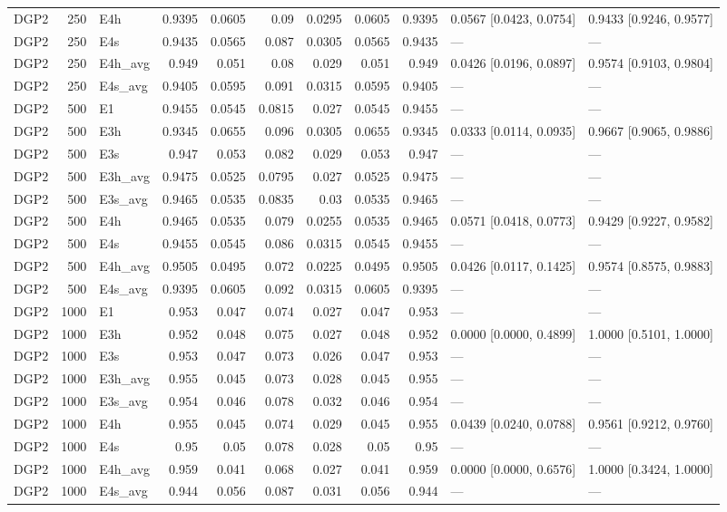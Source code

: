 \begin{scriptsize}
\begin{longtable}{lrlrrrrrrll}
DGP2 & 250 & E4h & 0.9395 & 0.0605 & 0.09 & 0.0295 & 0.0605 & 0.9395 & 0.0567 [0.0423, 0.0754] & 0.9433 [0.9246, 0.9577] \\
DGP2 & 250 & E4s & 0.9435 & 0.0565 & 0.087 & 0.0305 & 0.0565 & 0.9435 & --- & --- \\
DGP2 & 250 & E4h_avg & 0.949 & 0.051 & 0.08 & 0.029 & 0.051 & 0.949 & 0.0426 [0.0196, 0.0897] & 0.9574 [0.9103, 0.9804] \\
DGP2 & 250 & E4s_avg & 0.9405 & 0.0595 & 0.091 & 0.0315 & 0.0595 & 0.9405 & --- & --- \\
DGP2 & 500 & E1 & 0.9455 & 0.0545 & 0.0815 & 0.027 & 0.0545 & 0.9455 & --- & --- \\
DGP2 & 500 & E3h & 0.9345 & 0.0655 & 0.096 & 0.0305 & 0.0655 & 0.9345 & 0.0333 [0.0114, 0.0935] & 0.9667 [0.9065, 0.9886] \\
DGP2 & 500 & E3s & 0.947 & 0.053 & 0.082 & 0.029 & 0.053 & 0.947 & --- & --- \\
DGP2 & 500 & E3h_avg & 0.9475 & 0.0525 & 0.0795 & 0.027 & 0.0525 & 0.9475 & --- & --- \\
DGP2 & 500 & E3s_avg & 0.9465 & 0.0535 & 0.0835 & 0.03 & 0.0535 & 0.9465 & --- & --- \\
DGP2 & 500 & E4h & 0.9465 & 0.0535 & 0.079 & 0.0255 & 0.0535 & 0.9465 & 0.0571 [0.0418, 0.0773] & 0.9429 [0.9227, 0.9582] \\
DGP2 & 500 & E4s & 0.9455 & 0.0545 & 0.086 & 0.0315 & 0.0545 & 0.9455 & --- & --- \\
DGP2 & 500 & E4h_avg & 0.9505 & 0.0495 & 0.072 & 0.0225 & 0.0495 & 0.9505 & 0.0426 [0.0117, 0.1425] & 0.9574 [0.8575, 0.9883] \\
DGP2 & 500 & E4s_avg & 0.9395 & 0.0605 & 0.092 & 0.0315 & 0.0605 & 0.9395 & --- & --- \\
DGP2 & 1000 & E1 & 0.953 & 0.047 & 0.074 & 0.027 & 0.047 & 0.953 & --- & --- \\
DGP2 & 1000 & E3h & 0.952 & 0.048 & 0.075 & 0.027 & 0.048 & 0.952 & 0.0000 [0.0000, 0.4899] & 1.0000 [0.5101, 1.0000] \\
DGP2 & 1000 & E3s & 0.953 & 0.047 & 0.073 & 0.026 & 0.047 & 0.953 & --- & --- \\
DGP2 & 1000 & E3h_avg & 0.955 & 0.045 & 0.073 & 0.028 & 0.045 & 0.955 & --- & --- \\
DGP2 & 1000 & E3s_avg & 0.954 & 0.046 & 0.078 & 0.032 & 0.046 & 0.954 & --- & --- \\
DGP2 & 1000 & E4h & 0.955 & 0.045 & 0.074 & 0.029 & 0.045 & 0.955 & 0.0439 [0.0240, 0.0788] & 0.9561 [0.9212, 0.9760] \\
DGP2 & 1000 & E4s & 0.95 & 0.05 & 0.078 & 0.028 & 0.05 & 0.95 & --- & --- \\
DGP2 & 1000 & E4h_avg & 0.959 & 0.041 & 0.068 & 0.027 & 0.041 & 0.959 & 0.0000 [0.0000, 0.6576] & 1.0000 [0.3424, 1.0000] \\
DGP2 & 1000 & E4s_avg & 0.944 & 0.056 & 0.087 & 0.031 & 0.056 & 0.944 & --- & --- \\
\end{longtable}
\end{scriptsize}
